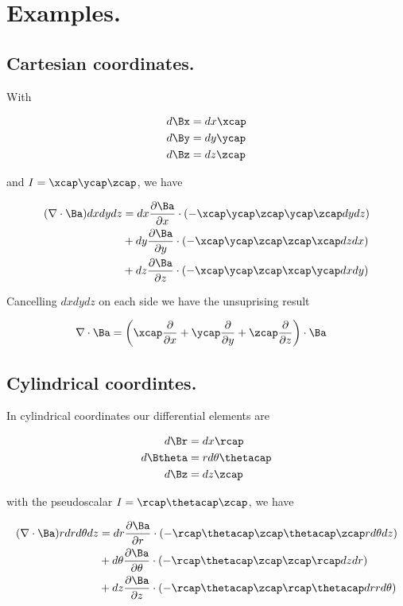 \section{Examples.}
\subsection{Cartesian coordinates.}

With 

\begin{align*}
d\Bx &= dx \xcap \\
d\By &= dy \ycap \\
d\Bz &= dz \zcap
\end{align*}

and $I = \xcap \ycap \zcap$, we have

\begin{align*}
(\grad \cdot \Ba ) dx dy dz &=
 dx \PD{x}{\Ba} \cdot (-\xcap \ycap \zcap \ycap \zcap dy dz )  \\
&+dy \PD{y}{\Ba} \cdot (-\xcap \ycap \zcap \zcap \xcap dz dx )  \\
&+dz \PD{z}{\Ba} \cdot (-\xcap \ycap \zcap \xcap \ycap dx dy ) 
\end{align*}

Cancelling $dx dy dz$ on each side we have the unsuprising result

\begin{align}\label{eqn:foo6}
\grad \cdot \Ba &= 
\left(\xcap \PD{x}{}
+\ycap \PD{y}{}
+\zcap \PD{z}{} \right) \cdot \Ba
\end{align}

\subsection{Cylindrical coordintes.}

In cylindrical coordinates our differential elements are

\begin{align*}
d\Br &= dx \rcap \\
d\Btheta &= r d\theta \thetacap \\
d\Bz &= dz \zcap
\end{align*}

with the pseudoscalar $I = \rcap \thetacap \zcap$, we have

\begin{align*}
(\grad \cdot \Ba ) r dr d\theta dz &=
 dr \PD{r}{\Ba} \cdot (-\rcap \thetacap \zcap \thetacap \zcap r d\theta dz )  \\
&+d\theta \PD{\theta}{\Ba} \cdot (-\rcap \thetacap \zcap \zcap \rcap dz dr )  \\
&+dz \PD{z}{\Ba} \cdot (-\rcap \thetacap \zcap \rcap \thetacap dr r d\theta ) 
\end{align*}

